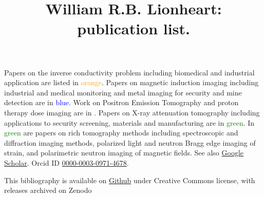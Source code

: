 \documentclass{article}
\title{William R.B. Lionheart: publication list.}
\begin{document}
\maketitle
Papers on the inverse conductivity problem including biomedical and industrial application are listed in \textcolor{orange}{orange}.  Papers on magnetic induction imaging including industrial and medical  monitoring and metal imaging for security and mine detection are in \textcolor{blue}{blue}.  Work on Positron Emission Tomography and proton therapy dose imaging are in \textcolor{purple}. Papers on X-ray attenuation tomography including applications to security screening, materials and manufacturing are in \textcolor{green}{green}. In \textcolor{green}{green} are papers on rich tomography methods including spectroscopic and diffraction imaging methods, polarized light and neutron Bragg edge imaging of strain, and polarimetric neutron imaging of magnetic fields. See also \href{https://scholar.google.com/citations?user=S1QF1uQAAAAJ&hl=en}{Google Scholar}. Orcid ID \href{https://orcid.org/0000-0003-0971-4678}{0000-0003-0971-4678}.

	\begin{refsection}
		\nocite{*} 
		\printbibliography[resetnumbers=true,
		title={References reverse chronological order}]   
	\end{refsection}

\small{This bibliography is available on \href{https://github.com/billlion/lionheartbibliography}{Github} under Creative Commons license, with releases archived on Zenodo}

\versionBox
\end{document}
